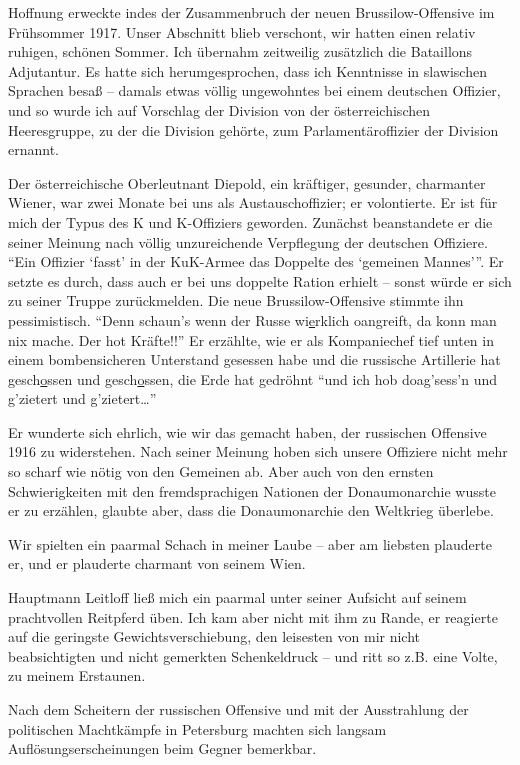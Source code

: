Hoffnung erweckte indes der Zusammenbruch der neuen Brussilow-Offen\-sive im Frühsommer 1917. Unser Abschnitt blieb verschont, wir hatten einen relativ ruhigen, schönen Sommer. Ich übernahm zeitweilig zusätzlich die Bataillons Adjutantur. Es hatte sich herumgesprochen, dass ich Kenntnisse in slawischen Sprachen besaß -- damals etwas völlig ungewohntes bei einem deutschen Offizier, und so wurde ich auf Vorschlag der Division von der österreichischen Heeresgruppe, zu der die Division gehörte, zum Parlamentäroffizier der Division ernannt.

Der österreichische Oberleutnant Diepold, ein kräftiger, gesunder, charmanter Wiener, war zwei Monate bei uns als Austauschoffizier; er volontierte. Er ist für mich der Typus des K und K-Offiziers geworden. Zunächst beanstandete er die seiner Meinung nach völlig unzureichende Verpflegung der deutschen Offiziere. \enquote{Ein Offizier \enquote{fasst} in der KuK-Armee das Doppelte des \enquote{gemeinen Mannes}}. Er setzte es durch, dass auch er bei uns doppelte Ration erhielt -- sonst würde er sich zu seiner Truppe zurückmelden. Die neue Brussilow-Offensive stimmte ihn pessimistisch. \enquote{Denn schaun's wenn der Russe wi\underline{e}rklich oangreift, da konn man nix mache. Der hot Kräfte!!} Er erzählte, wie er als Kompaniechef tief unten in einem bombensicheren Unterstand gesessen habe und die russische Artillerie hat gesch\underline{o}ssen und gesch\underline{o}ssen, die Erde hat gedröhnt \enquote{und ich hob doag'sess'n und g'zietert und g'zietert\dots}

Er wunderte sich ehrlich, wie wir das gemacht haben, der russischen Offensive 1916 zu widerstehen. Nach seiner Meinung hoben sich unsere Offiziere nicht mehr so scharf wie nötig von den Gemeinen ab. Aber auch von den ernsten Schwierigkeiten mit den fremdsprachigen Nationen der Donaumonarchie wusste er zu erzählen, glaubte aber, dass die Donaumonarchie den Weltkrieg überlebe.

Wir spielten ein paarmal Schach in meiner Laube -- aber am liebsten plauderte er, und er plauderte charmant von seinem Wien.

Hauptmann Leitloff ließ mich ein paarmal unter seiner Aufsicht auf seinem prachtvollen Reitpferd üben. Ich kam aber nicht mit ihm zu Rande, er reagierte auf die geringste Gewichtsverschiebung, den leisesten von mir nicht beabsichtigten und nicht gemerkten Schenkeldruck -- und ritt so z.B. eine Volte, zu meinem Erstaunen.

Nach dem Scheitern der russischen Offensive und mit der Ausstrahlung der politischen Machtkämpfe in Petersburg machten sich langsam Auflösungserscheinungen beim Gegner bemerkbar.

